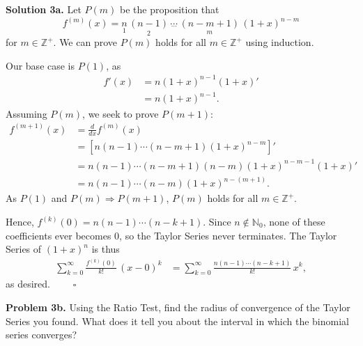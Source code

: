 \documentclass{article}
\begin{document}
\bigskip

\noindent\textbf{Solution 3a.} Let $P(m)$ be the proposition that
\[
    f^{(m)}(x) = \underset{1}{n}\,\underset{2}{(n-1)}\,\underset{\cdots}{\cdots}\,\underset{m}{(n-m+1)}\,(1+x)^{n-m}
\]
for $m \in \mathbb{Z}^+$. We can prove $P(m)$ holds for all $m \in \mathbb{Z}^+$ using induction.

\medskip

\noindent Our base case is $P(1)$, as
\begin{align*}
    f'(x) &= n(1+x)^{n-1}(1+x)' \\
          &= n(1+x)^{n-1}.
\end{align*}
Assuming $P(m)$, we seek to prove $P(m+1)$:
\begin{align*}
    f^{(m+1)}(x) &= \frac{d}{dx} f^{(m)}(x) \\
                 &= \left[n(n-1)\cdots(n-m+1)(1+x)^{n-m}\right]' \\
                 &= n(n-1)\cdots(n-m+1)(n-m)(1+x)^{n-m-1}(1+x)' \\
                 &= n(n-1)\cdots(n-m)(1+x)^{n-(m+1)}.
\end{align*}
As $P(1)$ and $P(m) \Rightarrow P(m+1)$, $P(m)$ holds for all $m \in \mathbb{Z}^+$.

\medskip

\noindent Hence, $f^{(k)}(0) = n(n-1)\cdots(n-k+1)$. Since $n \notin \mathbb{N}_0$, none of these coefficients ever becomes $0$, so the Taylor Series never terminates. The Taylor Series of $(1+x)^n$ is thus
\begin{align*}
    \sum_{k=0}^{\infty} \frac{f^{(k)}(0)}{k!}\,(x-0)^k
    &= \sum_{k=0}^{\infty} \frac{n(n-1)\cdots(n-k+1)}{k!}\, x^k,
\end{align*}
as desired. $\qquad \square$

\bigskip

\noindent\textbf{Problem 3b.} Using the Ratio Test, find the radius of convergence of the Taylor Series you found. What does it tell you about the interval in which the binomial series converges?

\bigskip
\end{document}
